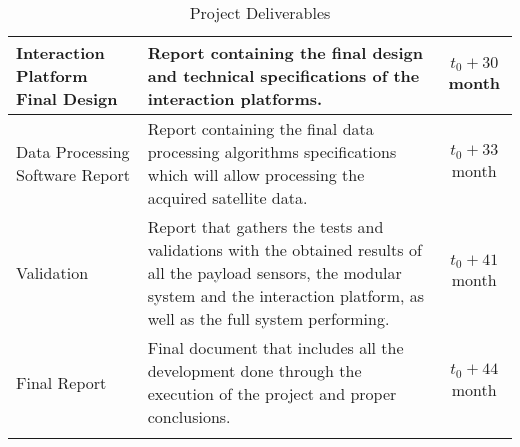 \begin{longtable}[H]{>{\raggedright\arraybackslash}p{4cm} p{8cm} c}
	\midrule
	
	Interaction Platform Final Design  & Report containing the final design and technical specifications of the interaction platforms.&$t_0 + 30$ month\vspace{0.2cm} \\
	
	\midrule
	
	Data Processing Software Report  & Report containing the final data processing algorithms specifications which will allow processing the acquired satellite data.&$t_0 + 33$ month\vspace{0.2cm} \\
	
	\midrule
	
	Validation & Report that gathers the tests and validations with the obtained results of all the payload sensors, the modular system and the interaction platform, as well as the full system performing.&$t_0 + 41$ month\vspace{0.2cm} \\
	
	\midrule
	
	Final Report & Final document that includes all the development done through the execution of the project and proper conclusions.&$t_0 + 44$ month\vspace{0.2cm} \\ 
	
	\bottomrule[2pt]
	
	\caption{Project Deliverables}
	\label{PDel}
\end{longtable}


